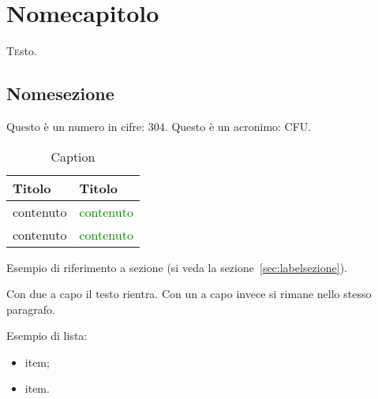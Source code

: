 \chapter{Nomecapitolo\label{sec:labelcapitolo}}
\lettrine[findent=1.5em]{T}esto.

\section{Nomesezione\label{sec:labelsezione}}

Questo è un numero in cifre: $304$.
Questo è un acronimo: \ac{CFU}.

\begin{table}[htp]
    \centering
    \normalsize
    \begin{tabularx}{\textwidth}{Xl}
        \toprule
        \textbf{Titolo} & \textbf{Titolo}\\
        \midrule
        contenuto & \textcolor{green}{contenuto}\\
        \midrule
        contenuto & \textcolor{green}{contenuto}\\
        \bottomrule
    \end{tabularx}
    \caption{Caption}
    \label{tab:labeltabella}
\end{table}

Esempio di riferimento a sezione (si veda la sezione~\vref{sec:labelsezione}).

Con due a capo il testo rientra.
Con un a capo invece si rimane nello stesso paragrafo.

Esempio di lista:
\begin{itemize}
    \item item;
    \item item.
    \label{lst:labellista}
\end{itemize}